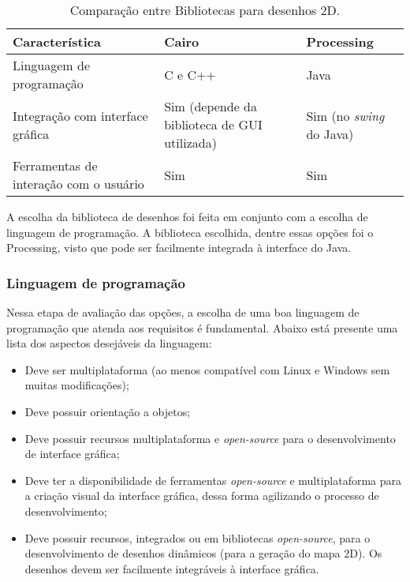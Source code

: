 \begin{table}
  \caption{Comparação entre Bibliotecas para desenhos 2D.}
  \centering
  \begin{tabular}{p{6cm}|p{4cm}p{4cm}}
    \toprule
    \textbf{Característica} & \textbf{Cairo} & \textbf{Processing} \\
    \midrule
    Linguagem de programação & C e C++ & Java \\
    \hline
    Integração com interface gráfica & Sim (depende da biblioteca de GUI utilizada) & Sim (no \textit{swing} do Java) \\
    \hline
    Ferramentas de interação com o usuário & Sim & Sim \\
    \bottomrule
  \end{tabular}
  \label{tab:alternativas_desenho}
\end{table}

A escolha da biblioteca de desenhos foi feita em conjunto com a escolha de linguagem de programação. A biblioteca escolhida, dentre essas opções foi o Processing, visto que pode ser facilmente integrada à interface do Java. 

\subsubsection{Linguagem de programação}

Nessa etapa de avaliação das opções, a escolha de uma boa linguagem de programação que atenda aos requisitos é fundamental. Abaixo está presente uma lista dos aspectos desejáveis da linguagem:

\begin{itemize}
  \item Deve ser multiplataforma (ao menos compatível com Linux e Windows sem muitas modificações);
  \item Deve possuir orientação a objetos;
  \item Deve possuir recursos multiplataforma e \textit{open-source} para o desenvolvimento de interface gráfica;
  \item Deve ter a disponibilidade de ferramentas \textit{open-source} e multiplataforma para a criação visual da interface gráfica, dessa forma agilizando o processo de desenvolvimento;
  \item Deve possuir recursos, integrados ou em bibliotecas \textit{open-source}, para o desenvolvimento de desenhos dinâmicos (para a geração do mapa 2D). Os desenhos devem ser facilmente integráveis à interface gráfica.
\end{itemize}


